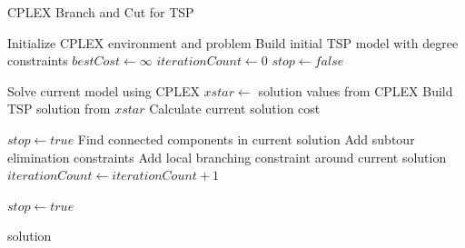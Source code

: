 \documentclass{article}
\begin{document}
\begin{algorithm}[!ht]
	\caption{CPLEX Branch and Cut for TSP}
	\begin{algorithmic}[1]
	\State Initialize CPLEX environment and problem
	\State Build initial TSP model with degree constraints
	\State $bestCost \gets \infty$
	\State $iterationCount \gets 0$
	\State $stop \gets false$
	
		\State Solve current model using CPLEX
		\State $xstar \gets$ solution values from CPLEX
		\State Build TSP solution from $xstar$
		\State Calculate current solution cost
		
			\State $stop \gets true$
		\Else
			\State Find connected components in current solution
			\State Add subtour elimination constraints
			\State Add local branching constraint around current solution
			\State $iterationCount \gets iterationCount + 1$
		\EndIf
		
			\State $stop \gets true$
		\EndIf
	\EndWhile
	
	\State \Return solution
	\EndProcedure
	\end{algorithmic}
	\end{algorithm}
\end{document}
